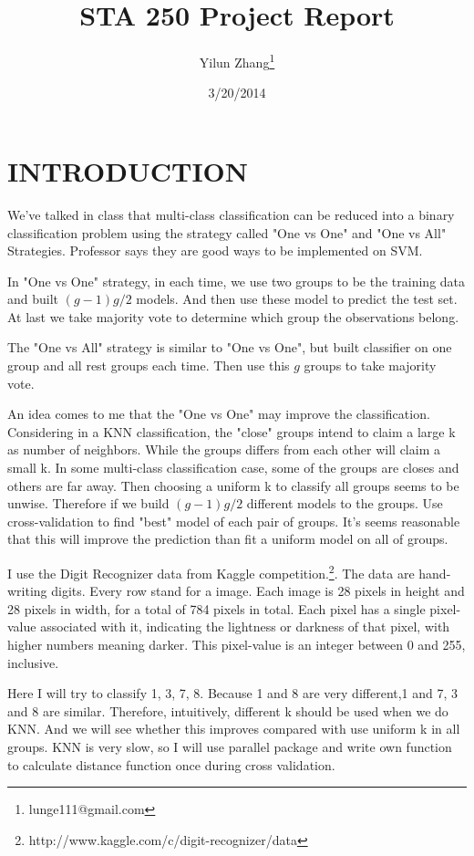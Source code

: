\documentclass[12pt,a4paper]{article}
\title{\huge STA 250 Project Report}
\date{3/20/2014}
\author{Yilun Zhang\thanks{lunge111@gmail.com}}
\begin{document}
\maketitle


\section{INTRODUCTION}
\qquad We've talked in class that multi-class classification can be reduced into a binary classification problem using the strategy called "One vs One" and "One vs All" Strategies. Professor says they are good ways to be implemented on SVM.

In "One vs One" strategy, in each time, we use two groups to be the training data and built $(g-1)g/2$ models. And then use these model to predict the test set. At last we take majority vote to determine which group the observations belong.

The "One vs All" strategy is similar to "One vs One", but built classifier on one group and all rest groups each time. Then use this $g$ groups to take majority vote.

An idea comes to me that the "One vs One" may improve the classification. Considering in a KNN classification, the "close" groups intend to claim a large k as number of neighbors. While the groups differs from each other will claim a small k. In some multi-class classification case, some of the groups are closes and others are far away. Then choosing a uniform k to classify all groups seems to be unwise. Therefore if we build $(g-1)g/2$ different models to the groups. Use cross-validation to find "best" model of each pair of groups. It's seems reasonable that this will improve the prediction than fit a uniform model on all of groups.

I use the Digit Recognizer data from Kaggle competition.\footnote{http://www.kaggle.com/c/digit-recognizer/data}. The data are hand-writing digits. Every row stand for a image. Each image is 28 pixels in height and 28 pixels in width, for a total of 784 pixels in total. Each pixel has a single pixel-value associated with it, indicating the lightness or darkness of that pixel, with higher numbers meaning darker. This pixel-value is an integer between 0 and 255, inclusive.

Here I will try to classify 1, 3, 7, 8. Because 1 and 8 are very different,1 and 7, 3 and 8 are similar. Therefore, intuitively, different k should be used when we do KNN. And we will see whether this improves compared with use uniform k in all groups. KNN is very slow, so I will use parallel package and write own function to calculate distance function once during cross validation.
\end{document}
